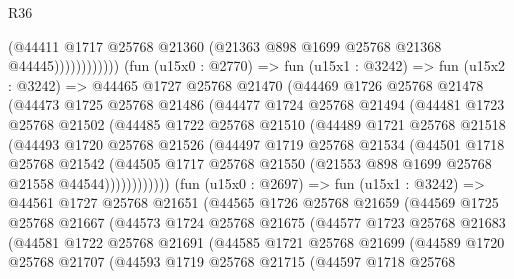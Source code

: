 \begin{lexlean}{R36}
\begin{coremodule}
                            (@44411
                              @1717
                              @25768
                              @21360
                              (@21363 @898 @1699 @25768 @21368 @44445))))))))))))
        (fun (u15x0 : @2770) =>
        fun (u15x1 : @3242) =>
        fun (u15x2 : @3242) =>
        @44465
          @1727
          @25768
          @21470
          (@44469
            @1726
            @25768
            @21478
            (@44473
              @1725
              @25768
              @21486
              (@44477
                @1724
                @25768
                @21494
                (@44481
                  @1723
                  @25768
                  @21502
                  (@44485
                    @1722
                    @25768
                    @21510
                    (@44489
                      @1721
                      @25768
                      @21518
                      (@44493
                        @1720
                        @25768
                        @21526
                        (@44497
                          @1719
                          @25768
                          @21534
                          (@44501
                            @1718
                            @25768
                            @21542
                            (@44505
                              @1717
                              @25768
                              @21550
                              (@21553 @898 @1699 @25768 @21558 @44544))))))))))))
        (fun (u15x0 : @2697) =>
        fun (u15x1 : @3242) =>
        @44561
          @1727
          @25768
          @21651
          (@44565
            @1726
            @25768
            @21659
            (@44569
              @1725
              @25768
              @21667
              (@44573
                @1724
                @25768
                @21675
                (@44577
                  @1723
                  @25768
                  @21683
                  (@44581
                    @1722
                    @25768
                    @21691
                    (@44585
                      @1721
                      @25768
                      @21699
                      (@44589
                        @1720
                        @25768
                        @21707
                        (@44593
                          @1719
                          @25768
                          @21715
                          (@44597
                            @1718
                            @25768

\end{coremodule}
\end{lexlean}
